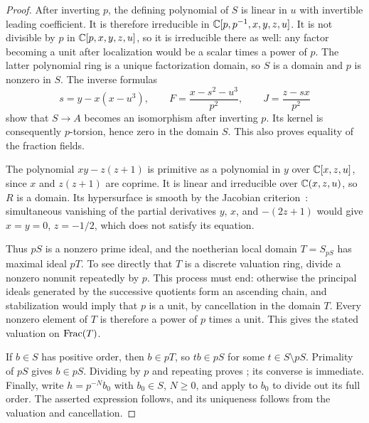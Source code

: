 \begin{proof}
After inverting $p$, the defining polynomial of $S$ is linear in $u$
with invertible leading coefficient.  It is therefore irreducible in
$\mathbb C[p,p^{-1},x,y,z,u]$.  It is not divisible by $p$ in
$\mathbb C[p,x,y,z,u]$, so it is irreducible there as well: any factor becoming
a unit after localization would be a scalar times a power of $p$.
The latter polynomial ring is a unique factorization domain, so $S$ is
a domain and $p$ is nonzero in $S$.  The inverse formulas
\[
 s=y-x(x-u^3),\qquad
 F=\frac{x-s^2-u^3}{p^2},\qquad
 J=\frac{z-sx}{p^2}
\]
show that $S\to A$ becomes an isomorphism after inverting $p$.
Its kernel is consequently $p$-torsion, hence zero in the domain $S$.
This also proves equality of the fraction fields.

The polynomial $xy-z(z+1)$ is primitive as a polynomial in $y$ over
$\mathbb C[x,z,u]$, since $x$ and $z(z+1)$ are coprime.  It is linear and
irreducible over $\mathbb C(x,z,u)$, so $R$ is a domain.  Its hypersurface is
smooth by the Jacobian criterion~\cite[Tags~00T6 and~00T7]{Stacks}:
simultaneous vanishing of the partial
derivatives $y$, $x$, and $-(2z+1)$ would give $x=y=0$, $z=-1/2$,
which does not satisfy its equation.

Thus $pS$ is a nonzero prime ideal, and the noetherian local domain
$T=S_{pS}$ has maximal ideal $pT$.  To see directly that $T$ is a
discrete valuation ring, divide a nonzero nonunit repeatedly by $p$.
This process must end: otherwise the principal ideals generated by the
successive quotients form an ascending chain, and stabilization would
imply that $p$ is a unit, by cancellation in the domain $T$.
Every nonzero element of $T$ is therefore a power of $p$ times a unit.
This gives the stated valuation on $\operatorname{Frac}(T)$.

If $b\in S$ has positive order, then $b\in pT$, so $tb\in pS$ for
some $t\in S\setminus pS$.  Primality of $pS$ gives $b\in pS$.
Dividing by $p$ and repeating proves
; its converse is immediate.
Finally, write $h=p^{-N}b_0$ with $b_0\in S$, $N\geq 0$, and apply
 to $b_0$ to divide out its full order.
The asserted expression follows, and its uniqueness follows from the
valuation and cancellation.
\end{proof}

